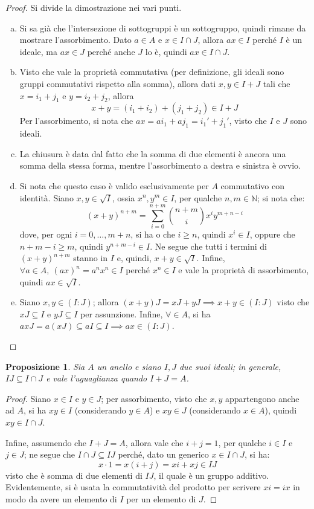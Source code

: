 \documentclass[12pt]{scrartcl}
\theoremstyle{style}
\newtheorem{prop}{Proposizione}[section]
\numberwithin{equation}{subsection}
\begin{document}
	\begin{proof}
		Si divide la dimostrazione nei vari punti.
		\begin{enumerate}[(a).]
			\item Si sa gi\`a che l'intersezione di sottogruppi \`e un sottogruppo, quindi rimane da mostrare l'assorbimento.
				Dato $a \in A$ e $x \in I \cap J$, allora $ax \in I$ perch\'e $I$ \`e un ideale, ma $ax \in J$ perch\'e anche $J$ lo \`e, quindi $ax \in I \cap J$.
			\item Visto che vale la propriet\`a commutativa (per definizione, gli ideali sono gruppi commutativi rispetto alla somma), allora dati $x, y \in I+J$ tali che $x = i_1 + j_1$ e $y = i_2+j_2$, allora
				\[
				x + y = (i_1+i_2)+(j_1+j_2) \in I+J
				\] 
				Per l'assorbimento, si nota che $ax = ai_1 + aj_1 = i_1' + j_1'$, visto che $I$ e $J$ sono ideali.
			\item La chiusura \`e data dal fatto che la somma di due elementi \`e ancora una somma della stessa forma, mentre l'assorbimento a destra e sinistra \`e ovvio.
			\item Si nota che questo caso \`e valido esclusivamente per $A$ commutativo con identit\`a.
				Siano $x,y \in \sqrt{I} $, ossia $x^n , y ^m \in I$, per qualche $n,m\in \mathbb{N}$; si nota che:
				\[
					(x+y)^{n+m} = \sum_{i=0}^{n+m} \binom{n+m}{i} x^i y^{m+n - i}
				\] 
				dove, per ogni $i= 0,\ldots,m+n$, si ha o che $i\ge n$, quindi $x^i \in I$, oppure che $n+m -i \ge m$, quindi $y^{n+m-i } \in I$.
				Ne segue che tutti i termini di $(x+y)^{n+m} $ stanno in $I$ e, quindi, $x+y \in \sqrt{I} $.
				Infine, $\forall  a \in A,\ (ax)^n = a^n x^n \in I$ perch\'e $x^n \in I$ e vale la propriet\`a di assorbimento, quindi $ax \in \sqrt{I} $.
			\item Siano $x,y \in (I:J)$; allora $(x+y) J = xJ + yJ \implies x+y \in (I:J)$ visto che $xJ \subseteq I$ e $yJ \subseteq I$ per assunzione.
				Infine, $\forall  \in A$, si ha $axJ = a(xJ) \subseteq aI \subseteq I \implies ax \in (I:J)$.
		\end{enumerate}
	\end{proof}
\begin{prop}
	Sia $A$ un anello e siano $I,J$ due suoi ideali; in generale, $IJ\subseteq  I\cap J$ e vale l'uguaglianza quando $I+J = A$.
\end{prop}
	\begin{proof}
		Siano $x \in I$ e $y \in J$; per assorbimento, visto che $x,y$ appartengono anche ad $A$, si ha $xy \in I$ (considerando $y \in A$) e $xy \in J$ (considerando $x \in A$), quindi $xy \in I\cap J$.

		Infine, assumendo che $I + J = A$, allora vale che $i + j = 1$, per qualche $i \in I$ e $j \in J$; ne segue che $I\cap J \subseteq IJ$ perch\'e, dato un generico $x \in I\cap J$, si ha:
		\[
		x \cdot 1 = x (i + j) = xi  + xj \in IJ
		\] 
		visto che \`e somma di due elementi di $IJ$, il quale \`e un gruppo additivo. 
		Evidentemente, si \`e usata la commutativit\`a del prodotto per scrivere $x i = i x$ in modo da avere un elemento di $I$ per un elemento di $J$.
	\end{proof}
\end{document}
